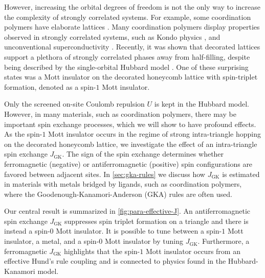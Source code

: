 \documentclass[reprint,aps,prb,amsmath,amssymb]{revtex4-2}
\begin{document}
However, increasing the orbital degrees of freedom is not the only way to increase the complexity of strongly correlated systems. For example, some coordination polymers have elaborate lattices \cite{Murase2017,Murase2017b,Kingsbury2017,Jeon2015,Darago2015,DeGayner2017,Henling2014,Henline2014,Polunin2015,Kalmutzki2018}. Many coordination polymers display properties observed in strongly correlated systems, such as Kondo physics \cite{Jiang2019,Kumar2021}, and unconventional superconductivity \cite{Zhang2017,Huang2018,Takenaka2021}. Recently, it was shown that decorated lattices support a plethora of strongly correlated phases away from half-filling, despite being described by the single-orbital Hubbard model \cite{Nourse2021}. One of these surprising states was a Mott insulator on the decorated honeycomb lattice with spin-triplet formation, denoted as a spin-$1$ Mott insulator.

Only the screened on-site Coulomb repulsion $U$ is kept in the Hubbard model. However, in many materials, such as coordination polymers, there may be important spin exchange processes, which we will show to have profound effects. As the spin-$1$ Mott insulator occurs in the regime of strong intra-triangle hopping on the decorated honeycomb lattice, we investigate the effect of an intra-triangle spin exchange $J_{\mathrm{GK}}$. The sign of the spin exchange determines whether ferromagnetic (negative) or antiferromagnetic (positive) spin configurations are favored between adjacent sites. In \cref{sec:gka-rules} we discuss how $J_{\mathrm{GK}}$ is estimated in materials with metals bridged by ligands, such as coordination polymers, where the Goodenough-Kanamori-Anderson (GKA) rules are often used.

Our central result is summarized in \cref{fig:para-effective-J}. An antiferromagnetic spin exchange $J_{\mathrm{GK}}$ suppresses spin triplet formation on a triangle and there is instead a spin-$0$ Mott insulator. It is possible to tune between a spin-$1$ Mott insulator, a metal, and a spin-$0$ Mott insulator by tuning $J_{\mathrm{GK}}$. Furthermore, a ferromagnetic $J_{\mathrm{GK}}$ highlights that the spin-$1$ Mott insulator occurs from an effective Hund's rule coupling and is connected to physics found in the Hubbard-Kanamori model.
\end{document}
